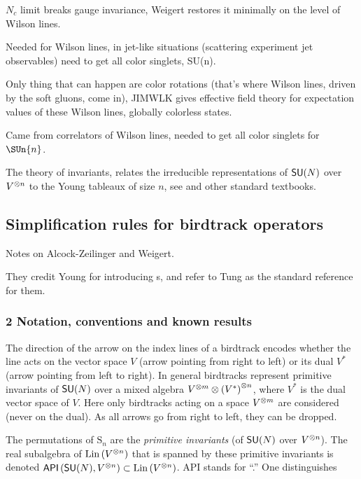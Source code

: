 $N_c$ limit breaks gauge invariance, Weigert restores it minimally on the
level of Wilson lines.

Needed for Wilson lines, in jet-like situations (scattering experiment jet
observables) need to get all color singlets, SU(n).

Only thing that can happen are color rotations (that's where Wilson lines,
driven by the soft gluons, come in), JIMWLK gives effective field theory for
expectation values of these Wilson lines, globally colorless states.

Came from correlators of Wilson lines, needed to get all color singlets for
$\SUn{n}$.

The theory of invariants,
relates the irreducible representations of $\mathsf{SU}(N)$ over $V^{\otimes n}$
to the Young tableaux of size $n$, see 
and other standard textbooks.


\subsection{Simplification rules for birdtrack operators}
\label{s-AlcZei16-1}

Notes on Alcock-Zeilinger and Weigert.

They credit Young for introducing \Ypo s,
and refer to Tung as the standard reference for them.

\subsubsection{%
2 Notation, conventions and known results}

The direction of the arrow on the index lines of a birdtrack encodes whether
the line acts on the vector space $V$ (arrow pointing from right to left) or
its dual $V^*$ (arrow pointing from left to right).
In general birdtracks represent primitive invariants of $\mathsf{SU}(N)$ over a mixed
algebra $V^{\otimes m}\otimes\left(V^*\right)^{\otimes n}$, where $V^*$ is the dual vector space of $V$.
Here only birdtracks acting on a space $V^{\otimes m}$ are considered (never on the
dual). As all arrows go from right to left, they can be dropped.

The permutations of $\textrm{S}_n$ are the \emph{primitive invariants}
(of $\mathsf{SU}(N)$ over $V^{\otimes n}$).
The real subalgebra of $\mathrm{Lin}\left( V^{\otimes n} \right)$ that is spanned by these primitive
invariants is denoted $\mathsf{API}\left( \mathsf{SU}(N),V^{\otimes n} \right)\subset\mathrm{Lin}\left( V^{\otimes n} \right)$.
{API} stands for ``\api.''
One
distinguishes

